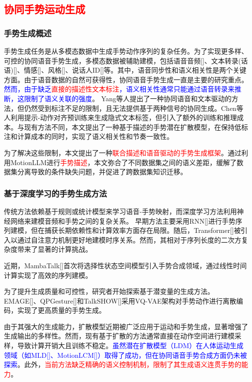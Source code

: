 \subsection{\textcolor{red}{协同手势运动生成}}

\subsubsection{手势生成概述}
手势生成任务是从多模态数据中生成手势动作序列的复杂任务。为了实现更多样、可控的协同语音手势生成，多模态数据被辅助建模，包括语音音频[]、文本转录(话语)[]、情感[]、风格[]、说话人ID[]等。其中，语音同步性和语义相关性是两个关键方面。由于语音数据的自然可获得性，协同语音手势生成一直是主要的研究重点。\textcolor{blue}{然而，由于缺乏\textcolor{red}{直接的描述性文本标注}，语义相关性通常只能通过语音转录来推断，这限制了语义关联的强度}。
Yang等人\cite{yang2024freetalker}提出了一种协同语音和文本驱动的方法，但仍然受到标注不足的限制，且无法提供基于两种信号的协同生成。Chen等人\cite{chen2024syntalker}利用提示-动作对齐预训练来生成隐式文本标签，但引入了额外的训练和推理成本。与现有方法不同，本文提出了一种基于描述的手势潜在扩散模型，在保持低标注和计算成本的同时，实现了语义相关性和节奏一致性。

为了解决这些限制，本文提出了一种\textcolor{red}{联合描述和语音驱动的手势生成框架}。通过利用MotionLLM进行\textcolor{red}{手势描述}，本文弥合了不同数据集之间的语义差距，缓解了数据集分离导致的条件缺失问题，并促进了跨数据集知识迁移。

\subsubsection{基于深度学习的手势生成方法}
传统方法依赖基于规则或统计模型来学习语音-手势映射，而深度学习方法利用神经网络来建模音频和手势之间的复杂关系\cite{nyatsanga2023comprehensive}。
早期方法主要采用RNN[]进行手势序列建模，但在捕获长期依赖性和计算效率方面存在局限。随后，Transformer[]被引入以通过自注意力机制更好地建模时序关系。然而，其相对于序列长度的二次方复杂度带来了显著的计算挑战。

近期，MambaTalk[]首次将选择性状态空间模型引入手势合成领域，通过线性时间计算实现了高效的序列建模。

为了提升生成质量和可控性，研究者开始探索基于潜变量的生成方法。EMAGE[]、QPGesture[]和TalkSHOW[]采用VQ-VAE架构对手势动作进行离散编码，实现了更高质量的手势生成。

由于其强大的生成能力，扩散模型近期被广泛应用于运动和手势生成，显著增强了生成输出的多样性。然而，现有基于扩散的方法通常直接在动作空间进行建模采样，导致计算开销大且训练不稳定。\textcolor{blue}{虽然潜在扩散模型（LDM）在人体运动生成领域（如MLD[]、MotionLCM[]）取得了成功，但在协同语音手势合成方面仍未被探索}。此外，\textcolor{red}{当前方法缺乏精确的语义控制机制，限制了其生成语义连贯手势的能力}。


